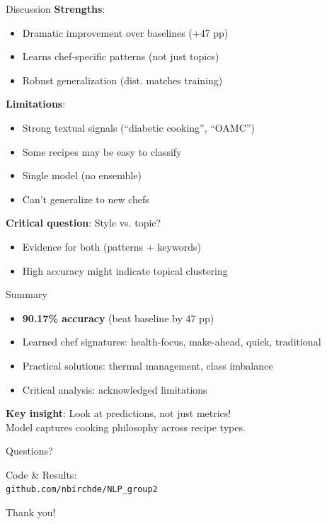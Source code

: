 \documentclass{beamer}
\begin{document}
\begin{frame}{Discussion}
\textbf{Strengths}:
\begin{itemize}
    \item Dramatic improvement over baselines (+47 pp)
    \item Learns chef-specific patterns (not just topics)
    \item Robust generalization (dist. matches training)
\end{itemize}

\vspace{0.3cm}

\textbf{Limitations}:
\begin{itemize}
    \item Strong textual signals (``diabetic cooking'', ``OAMC'')
    \item Some recipes may be easy to classify
    \item Single model (no ensemble)
    \item Can't generalize to new chefs
\end{itemize}

\vspace{0.3cm}

\textbf{Critical question}: Style vs. topic?
\begin{itemize}
    \item Evidence for both (patterns + keywords)
    \item High accuracy might indicate topical clustering
\end{itemize}
\end{frame}

\begin{frame}{Summary}
\begin{itemize}
    \item \textbf{90.17\% accuracy} (beat baseline by 47 pp)
    \item Learned chef signatures: health-focus, make-ahead, quick, traditional
    \item Practical solutions: thermal management, class imbalance
    \item Critical analysis: acknowledged limitations
\end{itemize}

\vspace{1cm}

\textbf{Key insight}: Look at predictions, not just metrics! \\
Model captures cooking philosophy across recipe types.
\end{frame}

\begin{frame}
\begin{center}
{\Huge Questions?}

\vspace{1cm}

{\large Code \& Results:} \\
\texttt{github.com/nbirchde/NLP\_group2}

\vspace{0.5cm}

Thank you!
\end{center}
\end{frame}
\end{document}
